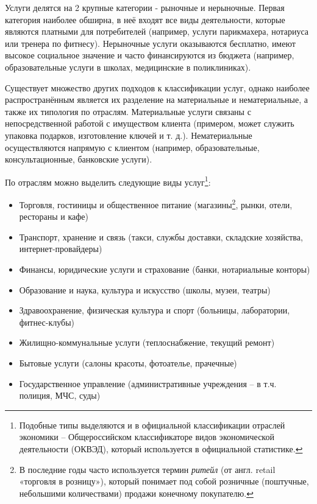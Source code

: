 \documentclass[
  11pt,
  russian,
]{book}
\providecommand{\tightlist}{%
  \setlength{\itemsep}{0pt}\setlength{\parskip}{0pt}}
\begin{document}
Услуги делятся на 2 крупные категории - рыночные и нерыночные. Первая категория наиболее обширна, в неё входят все виды
деятельности, которые являются платными для потребителей (например, услуги парикмахера, нотариуса или тренера по фитнесу). Нерыночные услуги оказываются бесплатно, имеют высокое социальное значение и часто финансируются из бюджета (например, образовательные услуги в школах, медицинские в поликлиниках).

Существует множество других подходов к классификации услуг, однако наиболее распространённым является их разделение на материальные и нематериальные, а также их типология по отраслям. Материальные услуги связаны с непосредственной работой с имуществом клиента (примером, может служить упаковка подарков, изготовление ключей и т. д.). Нематериальные осуществляются
напрямую с клиентом (например, образовательные, консультационные, банковские услуги).

По отраслям можно выделить следующие виды услуг\footnote{Подобные типы выделяются и в официальной классификации отраслей экономики -- Общероссийском классификаторе
  видов экономической деятельности (ОКВЭД), который используется в официальной статистике.}:

\begin{itemize}
\tightlist
\item
  Торговля, гостиницы и общественное питание (магазины\footnote{В последние годы часто используется термин \emph{ритейл} (от англ. retail «торговля в розницу»), который понимает под собой розничные (поштучные, небольшими количествами) продажи конечному покупателю.}, рынки, отели, рестораны и кафе)
\item
  Транспорт, хранение и связь (такси, службы доставки, складские хозяйства, интернет-провайдеры)
\item
  Финансы, юридические услуги и страхование (банки, нотариальные конторы)
\item
  Образование и наука, культура и искусство (школы, музеи, театры)
\item
  Здравоохранение, физическая культура и спорт (больницы, лаборатории, фитнес-клубы)
\item
  Жилищно-коммунальные услуги (теплоснабжение, текущий ремонт)
\item
  Бытовые услуги (салоны красоты, фотоателье, прачечные)
\item
  Государственное управление (административные учреждения -- в т.ч. полиция, МЧС, суды)
\end{itemize}
\end{document}
